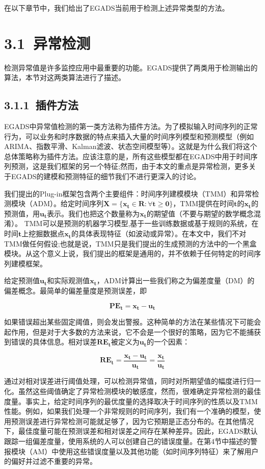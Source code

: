 \documentclass[a4paper,AutoFakeBold,oneside,12pt]{book}
\begin{document}
在以下章节中，我们给出了EGADS当前用于检测上述异常类型的方法。

\section*{3.1\ 异常检测}

检测异常值是许多监控应用中最重要的功能。EGADS提供了两类用于检测输出的算法，本节对这两类算法进行了描述。

\subsection*{3.1.1\ 插件方法}
	EGADS中异常值检测的第一类方法称为插件方法。为了模拟输入时间序列的正常行为，可以业务和时序数据的特点来插入大量的时间序列模型和预测模型（例如ARIMA、指数平滑、Kalman滤波、状态空间模型等）。这就是为什么我们将这个总体策略称为插件方法。应该注意的是，所有这些模型都在EGADS中用于时间序列预测，这是我们框架的另一个特征;然而，由于本文的重点是异常检测，更多关于EGADS的建模和预测特征的细节我们不进行更深入的讨论。

	我们提出的Plug-in框架包含两个主要组件：时间序列建模模块（TMM）和异常检测模块（ADM）。给定时间序列$\bm{X=\{x_t\in R:\forall t\ge 0\}}$，TMM提供在时间$\bm{t}$的$\bm{x_t}$的预测值，用$\bm{u_t}$表示。我们也把这个数量称为$\bm{x_t}$的期望值（不要与期望的数学概念混淆）。 TMM可以是预测的机器学习模型,基于一些训练数据或基于规则的系统，在时间$\bm{t}$上挖掘数据点$\bm{x_t}$的具体表现特征（如波动或异常）。在本文中，我们不对TMM做任何假设;也就是说，TMM只是我们提出的生成预测的方法中的一个黑盒模块。从这个意义上说，我们提出的框架是通用的，并不依赖于任何特定的时间序列建模框架。

	给定预测值$\bm{u_t}$和实际观测值$\bm{x_t}$，ADM计算出一些我们称之为偏差度量（DM）的偏差概念。最简单的偏差量度是预测误差，即

	$$\bm{PE_t=x_t-u_t}$$

如果错误超出某些固定阈值，则会发出警报。这种简单的方法在某些情况下可能会起作用，但是对于大多数的方法来说，它不会是一个很好的策略，因为它不能捕获到错误的具体信息。相对误差$\bm{RE_t}$被定义为$\bm{u_t}$的一个因素：

	$$\bm{RE_t=\frac{x_t-u_t}{u_t}=\frac{x_t}{u_t}}$$

通过对相对误差进行阈值处理，可以检测异常值，同时对所期望值的幅度进行归一化。虽然这些阈值确定了异常检测模块的敏感度，然而，很难确定异常检测的最佳度量。事实上，给定时间序列的最优度量的选择取决于时间序列的性质以及TMM性能。例如，如果我们处理一个非常规则的时间序列，我们有一个准确的模型，使用预测误差进行异常检测可能就足够了，因为它预期是正态分布的。在其他情况下，最佳度量可能在预测误差和相对误差之间存在某种差异。因此，EGADS默认跟踪一组偏差度量，使用系统的人可以创建自己的错误度量。在第4节中描述的警报模块（AM）中使用这些错误度量以及其他功能（如时间序列特征）来了解用户的偏好并过滤不重要的异常。
\end{document}
